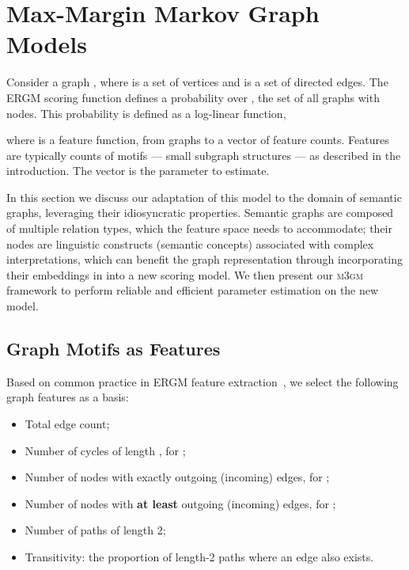 \documentclass[11pt,twocolumn]{article}
\newcommand{\ergm}[0]{ERGM}
\newcommand{\sysname}[0]{\textsc{m3gm}}
\begin{document}
 
\section{Max-Margin Markov Graph Models}
\label{sec:ergm}
Consider a graph , where  is a set of vertices and  is a set of directed edges. The \ergm{} scoring function defines a probability over , the set of all graphs with  nodes. This probability is defined as a log-linear function,

where  is a feature function, from graphs to a vector of feature counts. Features are typically counts of motifs --- small subgraph structures --- as described in the introduction. The vector  is the parameter to estimate.

In this section we discuss our adaptation of this model to the domain of semantic graphs,
leveraging their idiosyncratic properties. Semantic graphs are composed of multiple relation types, which the feature space needs to accommodate; their nodes are linguistic constructs (semantic concepts) associated with complex interpretations, which can benefit the graph representation through incorporating their embeddings in  into a new scoring model.
We then present our \sysname{} framework to perform reliable and efficient parameter estimation on the new model.


\subsection{Graph Motifs as Features}
\label{sec:feat-eng}

Based on common practice in \ergm{} feature extraction~\cite[e.g.,][]{morris2008specification},
we select the following graph features as a basis:
\begin{itemize}
  \setlength\itemsep{0pt}
\item Total edge count;
\item Number of cycles of length , for ;
\item Number of nodes with exactly  outgoing (incoming) edges, for ;
\item Number of nodes with \textbf{at least}  outgoing (incoming) edges, for ;
\item Number of paths of length 2;
\item Transitivity: the proportion of length-2 paths  where an edge  also exists.
\end{itemize}
\end{document}
